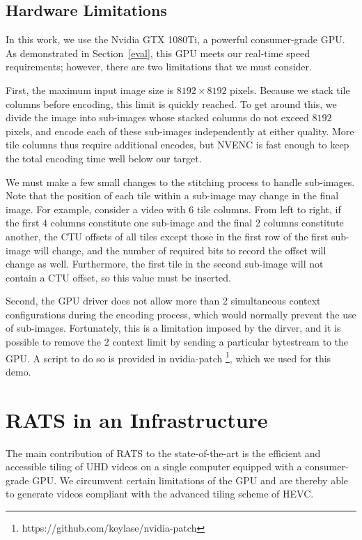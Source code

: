 \subsection{Hardware Limitations}

In this work, we use the Nvidia GTX 1080Ti, a powerful consumer-grade GPU. As demonstrated in Section~\ref{eval}, this GPU meets our real-time speed requirements; however, there are two limitations that we must consider.

First, the maximum input image size is $8192\times8192$ pixels. Because we stack tile columns before encoding, this limit is quickly reached. To get around this, we divide the image into sub-images whose stacked columns do not exceed $8192$ pixels, and encode each of these sub-images independently at either quality. More tile columns thus require additional encodes, but NVENC is fast enough to keep the total encoding time well below our target.

We must make a few small changes to the stitching process to handle sub-images. Note that the position of each tile within a sub-image may change in the final image. For example, consider a video with 6 tile columns. From left to right, if the first 4 columns constitute one sub-image and the final 2 columns constitute another, the CTU offsets of all tiles except those in the first row of the first sub-image will change, and the number of required bits to record the offset will change as well. Furthermore, the first tile in the second sub-image will not contain a CTU offset, so this value must be inserted.

Second, the GPU driver does not allow more than 2 simultaneous context configurations during the encoding process, which would normally prevent the use of sub-images. Fortunately, this is a limitation imposed by the dirver, and it is possible to remove the 2 context limit by sending a particular bytestream to the GPU. A script to do so is provided in nvidia-patch \footnote{https://github.com/keylase/nvidia-patch}, which we used for this demo.

\section{RATS in an Infrastructure} \label{infra}

The main contribution of RATS to the state-of-the-art is the efficient and accessible
tiling of UHD videos on a single computer equipped with a consumer-grade GPU. We circumvent certain limitations of the GPU and are thereby able to generate videos compliant with the advanced tiling scheme of HEVC.

